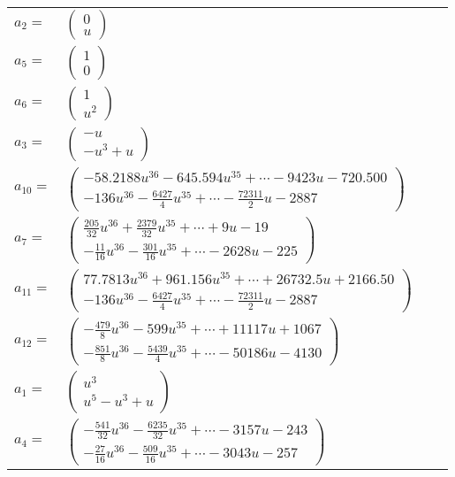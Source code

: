 \documentclass[1p]{elsarticle_modified}
\theoremstyle{definition}
\begin{document}
\begin{tabular}{m{7pt} m{180pt} m{7pt} m{180pt} }
\flushright $a_{2}=$&$\begin{pmatrix}0\\u\end{pmatrix}$ \\
\flushright $a_{5}=$&$\begin{pmatrix}1\\0\end{pmatrix}$ \\
\flushright $a_{6}=$&$\begin{pmatrix}1\\u^2\end{pmatrix}$ \\
\flushright $a_{3}=$&$\begin{pmatrix}- u\\- u^3+u\end{pmatrix}$ \\
\flushright $a_{10}=$&$\begin{pmatrix}-58.2188 u^{36}-645.594 u^{35}+\cdots-9423 u-720.500\\-136 u^{36}-\frac{6427}{4} u^{35}+\cdots-\frac{72311}{2} u-2887\end{pmatrix}$ \\
\flushright $a_{7}=$&$\begin{pmatrix}\frac{205}{32} u^{36}+\frac{2379}{32} u^{35}+\cdots+9 u-19\\-\frac{11}{16} u^{36}-\frac{301}{16} u^{35}+\cdots-2628 u-225\end{pmatrix}$ \\
\flushright $a_{11}=$&$\begin{pmatrix}77.7813 u^{36}+961.156 u^{35}+\cdots+26732.5 u+2166.50\\-136 u^{36}-\frac{6427}{4} u^{35}+\cdots-\frac{72311}{2} u-2887\end{pmatrix}$ \\
\flushright $a_{12}=$&$\begin{pmatrix}-\frac{479}{8} u^{36}-599 u^{35}+\cdots+11117 u+1067\\-\frac{851}{8} u^{36}-\frac{5439}{4} u^{35}+\cdots-50186 u-4130\end{pmatrix}$ \\
\flushright $a_{1}=$&$\begin{pmatrix}u^3\\u^5- u^3+u\end{pmatrix}$ \\
\flushright $a_{4}=$&$\begin{pmatrix}-\frac{541}{32} u^{36}-\frac{6235}{32} u^{35}+\cdots-3157 u-243\\-\frac{27}{16} u^{36}-\frac{509}{16} u^{35}+\cdots-3043 u-257\end{pmatrix}$ \\

\end{tabular}
\end{document}
